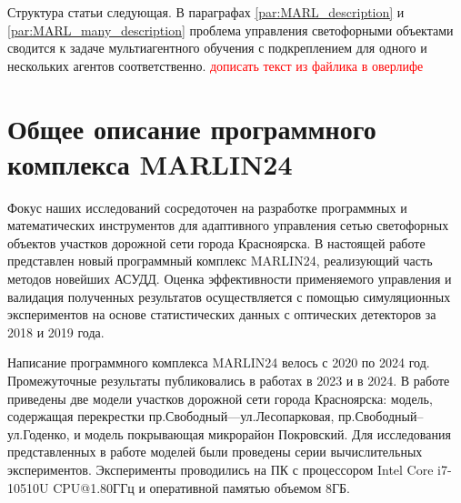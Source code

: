 \documentclass[11pt]{ubs}
\begin{document}




Структура статьи следующая. В {параграфах  \ref{par:MARL_description}} и \ref{par:MARL_many_description}
проблема управления 
светофорными объектами сводится к задаче мультиагентного обучения с подкреплением для одного и нескольких агентов соответственно. 
\textcolor{red}{дописать текст из файлика в оверлифе}

\section{Общее описание программного комплекса MARLIN24}


Фокус наших исследований сосредоточен на   разработке программных и математических инструментов для адаптивного управления сетью светофорных объектов участков дорожной сети города Красноярска. 
В настоящей работе представлен новый программный комплекс MARLIN24, реализующий часть методов новейших АСУДД. Оценка эффективности применяемого управления и валидация полученных результатов осуществляется с помощью симуляционных экспериментов на основе статистических данных с оптических детекторов за  2018 и 2019 года. 

Написание программного комплекса MARLIN24 велось с 2020 по 2024 год.
Промежуточные результаты публиковались в работах \cite{} в 2023 и \cite{} в 2024.
В работе приведены две модели участков дорожной сети города Красноярска: модель, содержащая перекрестки пр.Свободный---ул.Лесопарковая, пр.Свободный--ул.Годенко, и модель покрывающая микрорайон Покровский.
Для исследования представленных в работе моделей были проведены серии вычислительных экспериментов. Эксперименты проводились на ПК с процессором Intel Core i7-10510U CPU@1.80ГГц и оперативной памятью объемом 8ГБ.
\end{document}
